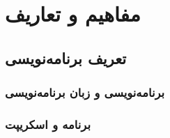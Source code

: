 \part{مفاهیم و تعاریف}
\chapter{تعریف برنامه‌نویسی}
\section{برنامه‌نویسی و زبان برنامه‌نویسی}
\section{برنامه و اسکریپت}

